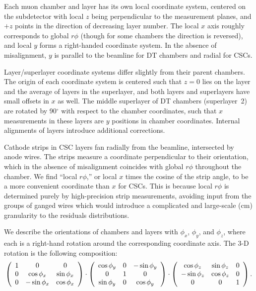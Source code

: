 Each muon chamber and layer has its own local coordinate system,
centered on the subdetector with local $z$ being perpendicular to the
measurement planes, and $+z$ points in the direction of decreasing
layer number.  The local $x$ axis roughly corresponds to global $r\phi$ (though for some chambers the direction is reversed),
and local $y$ forms a right-handed coordinate system.  In the absence
of misalignment, $y$ is parallel to the beamline for DT chambers and
radial for CSCs.

Layer/superlayer coordinate systems differ slightly from their parent
chambers.  The origin of each coordinate system is centered such that
$z=0$ lies on the layer and the average of layers in the superlayer, and
both layers and superlayers have small offsets in $x$ as well.  The
middle superlayer of DT chambers (superlayer~2) are rotated by 90$^\circ$ with
respect to the chamber coordinates, such that $x$ measurements in
these layers are $y$ positions in chamber coordinates.  Internal
alignments of layers introduce additional corrections.

Cathode strips in CSC layers fan radially from the beamline,
intersected by anode wires.  The strips measure a coordinate
perpendicular to their orientation, which in the absence of
misalignment coincides with global $r\phi$ throughout the chamber.  We
find ``local $r\phi$,'' or local $x$ times the cosine of the strip
angle, to be a more convenient coordinate than $x$ for CSCs.  This is
because local $r\phi$ is determined purely by high-precision strip
measurements, avoiding input from the groups of ganged wires which
would introduce a complicated and large-scale (cm) granularity to the
residuals distributions.

We describe the orientations of chambers and layers with $\phi_x$,
$\phi_y$, and $\phi_z$, where each is a right-hand rotation around the
corresponding coordinate axis.  The 3-D rotation is the following
composition:
\begin{equation}
\left(\begin{array}{c c c}
1 & 0 & 0 \\
0 & \cos\phi_x & \sin\phi_x \\
0 & -\sin\phi_x & \cos\phi_x
\end{array}\right) \cdot 
\left(\begin{array}{c c c}
\cos\phi_y & 0 & -\sin\phi_y \\
0 & 1 & 0 \\
\sin\phi_y & 0 & \cos\phi_y
\end{array}\right) \cdot
\left(\begin{array}{c c c}
\cos\phi_z & \sin\phi_z & 0 \\
-\sin\phi_z & \cos\phi_z & 0 \\
0 & 0 & 1
\end{array}\right)\mbox{.}
\end{equation}

